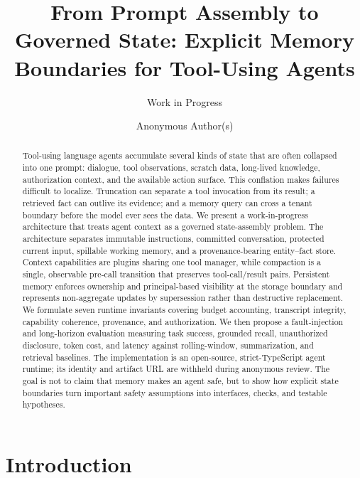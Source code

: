\documentclass[sigplan,10pt,anonymous,review]{acmart}
\begin{document}
\title{From Prompt Assembly to Governed State: Explicit Memory Boundaries for Tool-Using Agents}
\subtitle{Work in Progress}

\author{Anonymous Author(s)}

\begin{abstract}
Tool-using language agents accumulate several kinds of state that are often
collapsed into one prompt: dialogue, tool observations, scratch data,
long-lived knowledge, authorization context, and the available action surface.
This conflation makes failures difficult to localize.  Truncation can separate
a tool invocation from its result; a retrieved fact can outlive its evidence;
and a memory query can cross a tenant boundary before the model ever sees the
data.  We present a work-in-progress architecture that treats agent context as
a governed state-assembly problem.  The architecture separates immutable
instructions, committed conversation, protected current input, spillable
working memory, and a provenance-bearing entity--fact store.  Context
capabilities are plugins sharing one tool manager, while compaction is a
single, observable pre-call transition that preserves tool-call/result pairs.
Persistent memory enforces ownership and principal-based visibility at the
storage boundary and represents non-aggregate updates by supersession rather
than destructive replacement.  We formulate seven runtime invariants covering
budget accounting, transcript integrity, capability coherence, provenance,
and authorization.  We then propose a fault-injection and long-horizon
evaluation measuring task success, grounded recall, unauthorized disclosure,
token cost, and latency against rolling-window, summarization, and retrieval
baselines.  The implementation is an open-source, strict-TypeScript agent
runtime; its identity and artifact URL are withheld during anonymous review.
The goal is not to claim that memory makes an agent safe, but to show how
explicit state boundaries turn important safety assumptions into interfaces,
checks, and testable hypotheses.
\end{abstract}


\maketitle

\section{Introduction}
\end{document}
